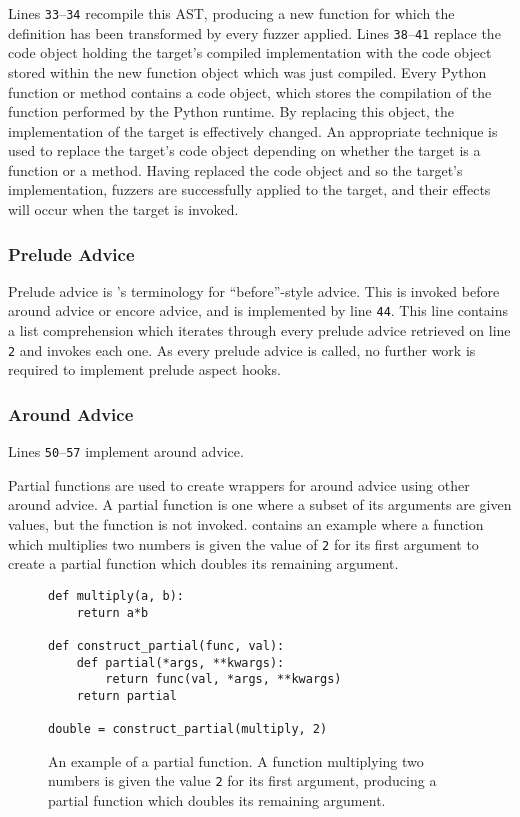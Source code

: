 Lines \texttt{33}--\texttt{34} recompile this AST, producing a new function for
which the definition has been transformed by every fuzzer applied. Lines
\texttt{38}--\texttt{41} replace the code object holding the target's compiled
implementation with the code object stored within the new function object which
was just compiled. Every Python function or method contains a code object, which
stores the compilation of the function performed by the Python runtime. By
replacing this object, the implementation of the target is effectively changed.
An appropriate technique is used to replace the target's code object depending
on whether the target is a function or a method. Having replaced the code object
and so the target's implementation, fuzzers are successfully applied to the
target, and their effects will occur when the target is invoked.


\subsubsection{Prelude Advice}

Prelude advice is \pdsf{}'s terminology for ``before''-style advice. This is
invoked before around advice or encore advice, and is implemented by line
\texttt{44}. This line contains a list comprehension which iterates through
every prelude advice retrieved on line \texttt{2} and invokes each one. As every
prelude advice is called, no further work is required to implement prelude
aspect hooks.

\subsubsection{Around Advice}

Lines \texttt{50}--\texttt{57} implement around advice.

Partial functions are used to create wrappers for around advice using other
around advice. A partial function is one where a subset of its arguments are
given values, but the function is not invoked.
 contains an example where a function
which multiplies two numbers is given the value of \lstinline{2} for its first
argument to create a partial function which doubles its remaining argument.

\begin{figure}
\begin{lstlisting}
def multiply(a, b):
    return a*b

def construct_partial(func, val):
    def partial(*args, **kwargs):
        return func(val, *args, **kwargs)
    return partial

double = construct_partial(multiply, 2)
\end{lstlisting}
\caption{An example of a partial function. A function multiplying two numbers is
given the value \lstinline{2} for its first argument, producing a partial
function which doubles its remaining argument.}
\label{fig:partial_function_explanation}
\end{figure}


